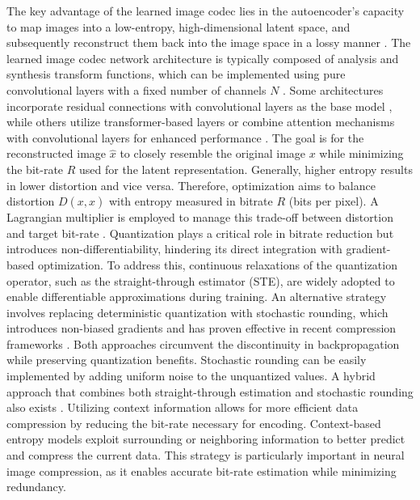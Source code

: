 \documentclass{article}
\begin{document}
The key advantage of the learned image codec lies in the autoencoder's capacity to map images into a low-entropy, high-dimensional latent space, and subsequently reconstruct them back into the image space in a lossy manner \cite{balleVariationalImageCompression2018}. The learned image codec network architecture is typically composed of analysis and synthesis transform functions, which can be implemented using pure convolutional layers with a fixed number of channels $N$ \cite{liuComprehensiveBenchmarkSingle2020}. Some architectures incorporate residual connections with convolutional layers as the base model \cite{liuLearnedImageCompression2023}, while others utilize transformer-based layers \cite{luTransformerbasedImageCompression2022} or combine attention mechanisms with convolutional layers for enhanced performance \cite{chengLearnedImageCompression2020}. The goal is for the reconstructed image $\hat{x}$ to closely resemble the original image $x$ while minimizing the bit-rate $R$ used for the latent representation. Generally, higher entropy results in lower distortion and vice versa. Therefore, optimization aims to balance distortion $D(x,\hat{x})$ with entropy measured in bitrate $R$ (bits per pixel). A Lagrangian multiplier is employed to manage this trade-off between distortion and target bit-rate \cite{ chengLearnedImageCompression2020}. Quantization plays a critical role in bitrate reduction but introduces non-differentiability, hindering its direct integration with gradient-based optimization. To address this, continuous relaxations of the quantization operator, such as the straight-through estimator (STE), are widely adopted to enable differentiable approximations during training. An alternative strategy involves replacing deterministic quantization with stochastic rounding, which introduces non-biased gradients and has proven effective in recent compression frameworks \cite{minnenJointAutoregressiveHierarchical2018,balleVariationalImageCompression2018}. Both approaches circumvent the discontinuity in backpropagation while preserving quantization benefits. Stochastic rounding can be easily implemented by adding uniform noise to the unquantized values. A hybrid approach that combines both straight-through estimation and stochastic rounding also exists \cite{jiangMLICLinearComplexity2024}. Utilizing context information allows for more efficient data compression by reducing the bit-rate necessary for encoding. Context-based entropy models exploit surrounding or neighboring information to better predict and compress the current data. This strategy is particularly important in neural image compression, as it enables accurate bit-rate estimation while minimizing redundancy.
\end{document}
